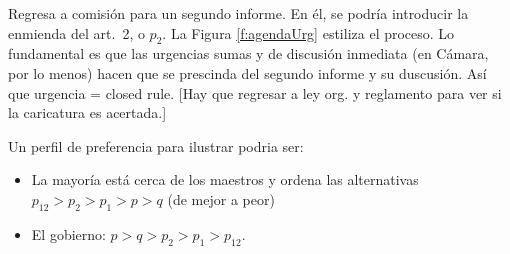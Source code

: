 Regresa a comisión para un segundo informe. En él, se podría introducir la enmienda del art.\ 2, o $p_2$. La Figura \ref{f:agendaUrg} estiliza el proceso. Lo fundamental es que las urgencias sumas y de discusión inmediata (en Cámara, por lo menos) hacen que se prescinda del segundo informe y su duscusión. Así que urgencia = closed rule. [Hay que regresar a ley org. y reglamento para ver si la caricatura es acertada.]

Un perfil de preferencia para ilustrar podria ser:
\begin{itemize}
\item La mayoría está cerca de los maestros y ordena las alternativas $p_{12}>p_{2}>p_{1}>p>q$ (de mejor a peor)
\item El gobierno:  $p>q>p_2>p_1>p_{12}$.
\end{itemize}




